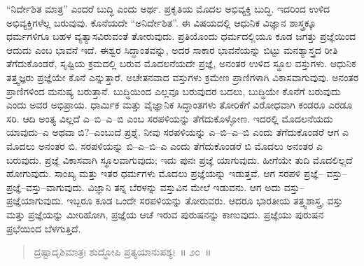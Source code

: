 “ನಿರ್ದೇಶಿತ ಮಾತ್ರ” ಎಂದರೆ ಬುದ್ಧಿ ಎಂದು ಅರ್ಥ. ಪ್ರಕೃತಿಯ ಮೊದಲ ಅಭಿವ್ಯಕ್ತಿ ಬುದ್ಧಿ. ಇದರಿಂದ ಉಳಿದ ಅಭಿವ್ಯಕ್ತಿಗಳೆಲ್ಲ ಬರುವುವು. ಕೊನೆಯದೇ “ಅನಿರ್ದೇಶಿತ”. ಈ ವಿಷಯದಲ್ಲಿ ಆಧುನಿಕ ವಿಜ್ಞಾನ ಶಾಸ್ತ್ರಕ್ಕೂ ಧರ್ಮಗಳಿಗೂ ಬಹಳ ವ್ಯತ್ಯಾಸವಿರುವಂತೆ ತೋರುವುದು. ಪ್ರತಿಯೊಂದು ಧರ್ಮದಲ್ಲಿಯೂ ಕೂಡ ಜಗತ್ತು ಪ್ರಜ್ಞೆಯಿಂದ ಆದುದು ಎಂಬ ಭಾವನೆ ಇದೆ. ಈಶ್ವರ ಸಿದ್ಧಾಂತವನ್ನು, ಅದರ ಸಾಕಾರ ಭಾವನೆಯನ್ನು ಬಿಟ್ಟು ಮನಶ್ಯಾಸ್ತ್ರದ ರೀತಿ ತೆಗೆದುಕೊಂಡರೆ, ಸೃಷ್ಟಿಯ ಕ್ರಮದಲ್ಲಿ ಬರುವ ಮೊದಲನೆಯದೇ ಪ್ರಜ್ಞೆ, ಅನಂತರ ಉಳಿದ ಸ್ಥೂಲ ವಸ್ತುಗಳು. ಆಧುನಿಕ ತತ್ತ್ವಜ್ಞರು ಪ್ರಜ್ಞೆಯೇ ಕೊನೆ ಎನ್ನುತ್ತಾರೆ. ಅಚೇತನವಾದ ವಸ್ತುಗಳು ಕ್ರಮೇಣ ಪ್ರಾಣಿಗಳಾಗಿ ವಿಕಾಸವಾಗುವುವು. ಅನಂತರ ಪ್ರಾಣಿಗಳಿಂದ ಮನುಷ್ಯ ಬರುತ್ತಾನೆ. ಬುದ್ಧಿಯಿಂದ ಎಲ್ಲವೂ ಬರುವುದರ ಬದಲು, ಬುದ್ಧಿಯೇ ಕೊನೆಗೆ ಬರುವುದು ಎಂದು ಅವರ ಅಭಿಪ್ರಾಯ. ಧಾರ್ಮಿಕ ಮತ್ತು ವೈಜ್ಞಾನಿಕ ಸಿದ್ಧಾಂತಗಳು ತೋರಿಕೆಗೆ ವಿರೋಧವಾಗಿ ಕಂಡರೂ ಎರಡೂ ಸರಿ. ಆದಿ ಅಂತ್ಯ ವಿಲ್ಲದೆ ಎ–ಬಿ–ಎ–ಬಿ ಎಂಬ ಸರಪಳಿಯನ್ನು ತೆಗೆದುಕೊಳ್ಳೋಣ. ಇದರಲ್ಲಿ ಮೊದಲನೆಯದು ಯಾವುದು–ಎ ಅಥವಾ ಬಿ?–ಎಂಬುದೆ ಪ್ರಶ್ನೆ. ನೀವು ಸರಪಳಿಯನ್ನು ಎ–ಬಿ–ಎ–ಬಿ ಎಂದು ತೆಗೆದುಕೊಂಡರೆ ಆಗ ಎ ಮೊದಲು ಅನಂತರ ಬಿ. ಸರಪಳಿಯನ್ನು ಬಿ–ಎ–ಬಿ–ಎ ಎಂದು ತೆಗೆದುಕೊಂಡರೆ ಬಿ ಮೊದಲು ಅನಂತರ ಎ ಬರುವುದು. ಪ್ರಜ್ಞೆ ವಿಕಾಸವಾಗಿ ಸ್ಥೂಲವಾಗುವುದು; ಇದು ಪುನಃ ಪ್ರಜ್ಞೆ ಯಾಗುವುದು. ಹೀಗೆಯೇ ತುದಿ ಮೊದಲಿಲ್ಲದೆ ಹೋಗುವುದು. ಸಾಂಖ್ಯ ಮತ್ತು ಇತರ ಧರ್ಮಗಳು ಮೊದಲು ಪ್ರಜ್ಞೆಯನ್ನು ಇಡುತ್ತವೆ. ಆಗ ಸರಪಳಿ ಪ್ರಜ್ಞೆ– ವಸ್ತು–ಪ್ರಜ್ಞೆ–ವಸ್ತು–ವಾಗುವುದು. ವಿಜ್ಞಾನಿ ತನ್ನ ಬೆರಳನ್ನು ವಸ್ತುವಿನ ಮೇಲೆ ಇಡುವನು. ಆಗ ಅದು ವಸ್ತು–ಪ್ರಜ್ಞೆಯಾಗುವುದು. ಇಬ್ಬರೂ ಕೂಡ ಒಂದೇ ಸರಪಳಿಯನ್ನು ತೋರುವರು. ಆದರೂ ಭಾರತೀಯ ತತ್ತ್ವಶಾಸ್ತ್ರ, ವಸ್ತು ಮತ್ತು ಪ್ರಜ್ಞೆಯನ್ನು ಮೀರಿಹೋಗಿ, ಪ್ರಜ್ಞೆಯ ಆಚೆ ಇರುವ ಪುರುಷನನ್ನು ಕಾಣುವುದು. ಪ್ರಜ್ಞೆಯು ಪುರುಷನ ಪ್ರಭೆಯಿಂದ ಬೆಳಗುತ್ತಿದೆ. 


\begin{verse}
ದ್ರಷ್ಟಾದೃಶಿಮಾತ್ರಃ ಶುದ್ಧೋಪಿ ಪ್ರತ್ಯಯಾನುಪಶ್ಯಃ~॥ ೨೦~॥
\end{verse}



\vskip 0.2cm

